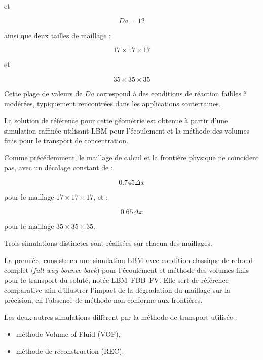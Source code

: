 \documentclass[12pt,a4paper]{report}
\begin{document}
et

\begin{equation}
Da=12
\end{equation}

ainsi que deux tailles de maillage :

\begin{equation}
17 \times 17 \times 17
\end{equation}

et

\begin{equation}
35 \times 35 \times 35
\end{equation}

Cette plage de valeurs de $Da$ correspond à des conditions de réaction faibles à modérées, typiquement rencontrées dans les applications souterraines.

La solution de référence pour cette géométrie est obtenue à partir d’une simulation raffinée utilisant LBM pour l’écoulement et la méthode des volumes finis pour le transport de concentration.

Comme précédemment, le maillage de calcul et la frontière physique ne coïncident pas, avec un décalage constant de :

\begin{equation}
0.745\Delta x
\end{equation}

pour le maillage $17 \times 17 \times 17$, et :

\begin{equation}
0.65\Delta x
\end{equation}

pour le maillage $35 \times 35 \times 35$.

Trois simulations distinctes sont réalisées sur chacun des maillages.

La première consiste en une simulation LBM avec condition classique de rebond complet (\textit{full-way bounce-back}) pour l’écoulement et méthode des volumes finis pour le transport du soluté, notée LBM--FBB--FV. Elle sert de référence comparative afin d’illustrer l’impact de la dégradation du maillage sur la précision, en l’absence de méthode non conforme aux frontières.

Les deux autres simulations diffèrent par la méthode de transport utilisée :

\begin{itemize}
\item méthode Volume of Fluid (VOF),
\item méthode de reconstruction (REC).
\end{itemize}
\end{document}
